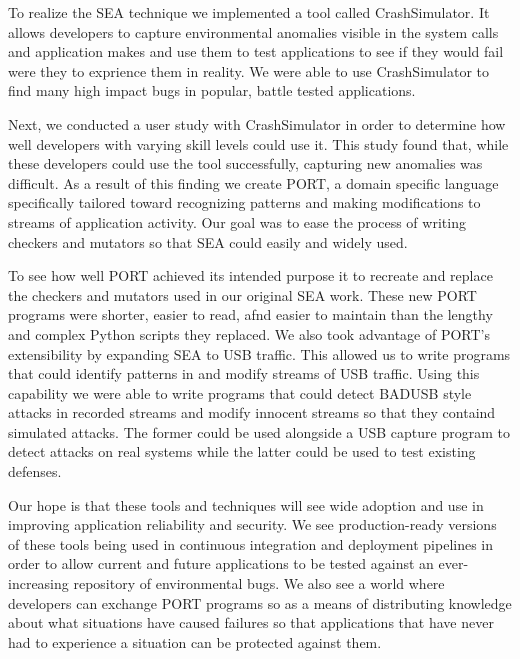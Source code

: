 To realize the SEA technique we implemented a tool called CrashSimulator.
It allows developers to capture environmental anomalies visible in the
system calls and application makes and use them to test applications to see
if they would fail were they to exprience them in reality.
We were able to use CrashSimulator to find many high impact bugs in
popular,
battle tested applications.

Next, we conducted a user study with CrashSimulator in order to determine
how well developers with varying skill levels could use it.
This study found that,
while these developers could use the tool successfully,
capturing new anomalies was difficult.
As a result of this finding we create PORT,
a domain specific language
specifically tailored toward recognizing patterns and making modifications
to streams of application activity.
Our goal was to ease the process of
writing checkers and mutators so that SEA could easily and widely used.

To see how well PORT achieved its intended purpose it to recreate and
replace the checkers and mutators used in our original SEA work.
These new PORT programs were shorter, easier to read, afnd easier to
maintain than the lengthy and complex Python scripts they replaced.
We also took advantage of PORT's extensibility by expanding SEA to USB
traffic.
This allowed us to write programs that could identify patterns in and
modify streams of USB traffic.
Using this capability we were able to write programs that could
detect BADUSB style attacks in recorded streams and modify innocent streams
so that they containd simulated attacks.
The former could be used alongside a USB capture program to detect attacks
on real systems while the latter could be used to test existing defenses.

Our hope is that these tools and techniques will see wide
adoption and use in improving application reliability and security.
We see production-ready versions of these tools being used in continuous
integration and deployment pipelines in order to allow current and future
applications to be tested against an ever-increasing repository of
environmental bugs.
We also see a world where developers can exchange PORT programs so as a
means of distributing knowledge about what situations have caused failures
so that applications that have never had to experience a situation can
be protected against them.

\vspace*{3ex plus 1fil}

